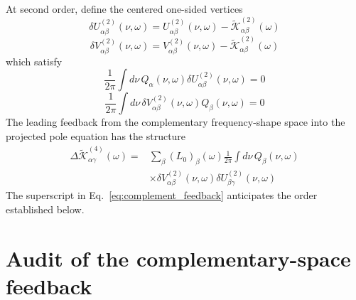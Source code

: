 \documentclass[aip,jcp,reprint,noshowkeys,superscriptaddress]{revtex4-1}
\begin{document}
At second order, define the centered one-sided vertices
\begin{equation}
	\delta U^{(2)}_{\alpha\beta}(\nu,\omega)
	=
	U^{(2)}_{\alpha\beta}(\nu,\omega)
	-
	\widetilde{\mathcal K}^{(2)}_{\alpha\beta}(\omega)
	\label{eq:delta_U}
\end{equation}
\begin{equation}
	\delta V^{(2)}_{\alpha\beta}(\nu,\omega)
	=
	V^{(2)}_{\alpha\beta}(\nu,\omega)
	-
	\widetilde{\mathcal K}^{(2)}_{\alpha\beta}(\omega)
	\label{eq:delta_V}
\end{equation}
which satisfy
\begin{equation}
	\frac{1}{2\pi}
	\int d\nu\,
	Q_\alpha(\nu,\omega)
	\delta U^{(2)}_{\alpha\beta}(\nu,\omega)
	=
	0
	\label{eq:delta_U_zero}
\end{equation}
\begin{equation}
	\frac{1}{2\pi}
	\int d\nu\,
	\delta V^{(2)}_{\alpha\beta}(\nu,\omega)
	Q_\beta(\nu,\omega)
	=
	0
	\label{eq:delta_V_zero}
\end{equation}
The leading feedback from the complementary frequency-shape space into the projected pole equation has the structure
\begin{equation}
	\begin{split}
	\Delta\widetilde{\mathcal K}^{(4)}_{\alpha\gamma}(\omega)
	={}&
	\sum_\beta
	(L_0)_\beta(\omega)
	\frac{1}{2\pi}
	\int d\nu\,
	Q_\beta(\nu,\omega)
	\\
	&\times
	\delta V^{(2)}_{\alpha\beta}(\nu,\omega)
	\delta U^{(2)}_{\beta\gamma}(\nu,\omega)
	\end{split}
	\label{eq:complement_feedback}
\end{equation}
The superscript in Eq.~\eqref{eq:complement_feedback} anticipates the order established below.

\section[Complementary-space feedback]{Audit of the complementary-space feedback}
\label{sec:feedback_audit}
\end{document}
